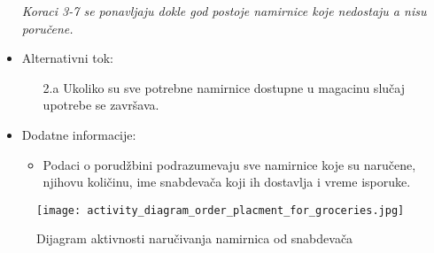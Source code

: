 \begin{itemize}
\begin{enumerate}
            
		\end{enumerate}
		\textit{Koraci 3-7 se ponavljaju dokle god postoje namirnice koje nedostaju a nisu poručene.}
	\item Alternativni tok:
		\begin{itemize}
		    \item[2.a] Ukoliko su sve potrebne namirnice dostupne u magacinu slučaj upotrebe se završava.
		 
		\end{itemize}
   \item Dodatne informacije:
		\begin{itemize}
		    \item Podaci o porudžbini podrazumevaju sve namirnice koje su naručene, njihovu količinu, ime snabdevača koji ih dostavlja i vreme isporuke.
	
		\end{itemize}
\end{itemize}

\begin{figure}[H]
\begin{center}
\texttt{[image: activity\_diagram\_order\_placment\_for\_groceries.jpg]}
\end{center}
    \caption{Dijagram aktivnosti naručivanja namirnica od snabdevača}
\label{fig:Activity_diagram_order_placment_for_groceries}
\end{figure}
